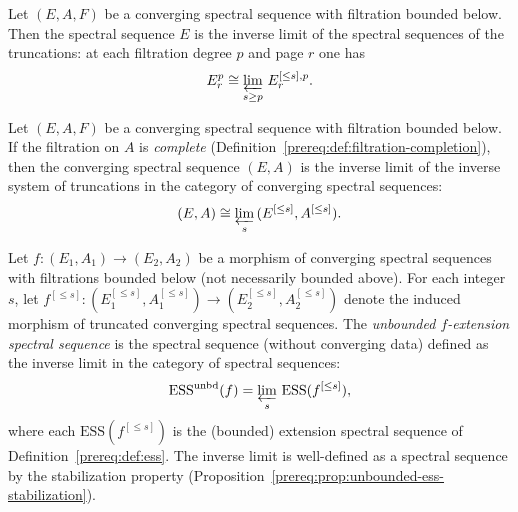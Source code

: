 \begin{proposition}\label{prereq:prop:invlim-of-truncations-ss}
    Let $(E, A, F)$ be a converging spectral sequence with filtration bounded below. Then the spectral sequence $E$ is the inverse limit of the spectral sequences of the truncations: at each filtration degree $p$ and page $r$ one has
    $$E_r^p \cong \varprojlim_{s \ge p}\, E_r^{[\le s],p}.$$
\end{proposition}

\begin{proposition}\label{prereq:prop:invlim-of-truncations-complete}
    Let $(E, A, F)$ be a converging spectral sequence with filtration bounded below. If the filtration on $A$ is \emph{complete} (Definition~\ref{prereq:def:filtration-completion}), then the converging spectral sequence $(E, A)$ is the inverse limit of the inverse system of truncations in the category of converging spectral sequences:
    $$(E, A) \cong \varprojlim_{s}\, (E^{[\le s]}, A^{[\le s]}).$$
\end{proposition}

\begin{definition}\label{prereq:def:unbounded-ess}
    Let $f: (E_1, A_1) \to (E_2, A_2)$ be a morphism of converging spectral sequences with filtrations bounded below (not necessarily bounded above). For each integer $s$, let $f^{[\le s]}: (E_1^{[\le s]}, A_1^{[\le s]}) \to (E_2^{[\le s]}, A_2^{[\le s]})$ denote the induced morphism of truncated converging spectral sequences. The \emph{unbounded $f$-extension spectral sequence} is the spectral sequence (without converging data) defined as the inverse limit in the category of spectral sequences:
    $$\mathrm{ESS}^{\mathrm{unbd}}(f) = \varprojlim_{s}\, \mathrm{ESS}(f^{[\le s]}),$$
    where each $\mathrm{ESS}(f^{[\le s]})$ is the (bounded) extension spectral sequence of Definition~\ref{prereq:def:ess}. The inverse limit is well-defined as a spectral sequence by the stabilization property (Proposition~\ref{prereq:prop:unbounded-ess-stabilization}).
\end{definition}

